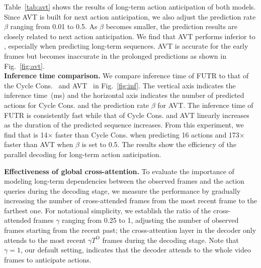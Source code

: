 Table~\ref{tab:avt} shows the results of long-term action anticipation of both models. 
Since AVT is built for next action anticipation, we also adjust the prediction rate $\beta$ ranging from 0.01 to 0.5. 
As $\beta$ becomes smaller, the prediction results are closely related to next action anticipation.
We find that AVT performs inferior to \ours, especially when predicting long-term sequences. AVT is accurate for the early frames but becomes inaccurate in the prolonged predictions as shown in Fig.~\ref{fig:avt}.
\\
\noindent
\textbf{Inference time comparison.}
We compare inference time of FUTR to that of the Cycle Cons.~\cite{farha2020long} and AVT~\cite{girdhar2021anticipative} in Fig.~\ref{fig:inf}.
The vertical axis indicates the inference time~(ms) and the horizontal axis indicates the number of predicted actions for Cycle Cons. and the prediction rate $\beta$ for AVT.
The inference time of FUTR is consistently fast while that of Cycle Cons. and AVT linearly increases as the duration of the predicted sequence increases.
From this experiment, we find that \ours is 14$\times$ faster than Cycle Cons. when predicting 16 actions and 173$\times$ faster than AVT when $\beta$ is set to 0.5.
The results show the efficiency of the parallel decoding for long-term action anticipation.







\noindent
\textbf{Effectiveness of global cross-attention.} 
To evaluate the importance of modeling long-term dependencies between the observed frames and the action queries during the decoding stage, we measure the performance by gradually increasing the number of cross-attended frames from the most recent frame to the farthest one.
For notational simplicity, we establish the ratio of the cross-attended frames $\gamma$ ranging from 0.25 to 1, adjusting the number of observed frames starting from the recent past; the cross-attention layer in the decoder only attends to the most recent $\gamma T^\textrm{O}$ frames during the decoding stage.
Note that $\gamma = 1$, our default setting, indicates that the decoder attends to the whole video frames to anticipate actions.

